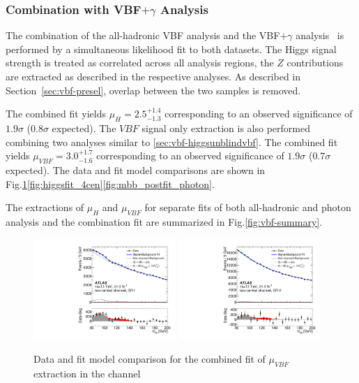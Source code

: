 \subsubsection{Combination with VBF$+\gamma$ Analysis}
\label{sec:vbf-higgscomb}

The combination of the all-hadronic VBF analysis and the
VBF$+\gamma$ analysis~\cite{vbfplusgammaint} is performed
by a simultaneous likelihood fit to both datasets. The Higgs signal strength is
treated as correlated across all analysis regions,
the $Z$ contributions are extracted as described in the respective analyses.
As described in Section~\ref{sec:vbf-presel}, overlap between the two samples is removed.

The combined fit yields $\mu_H = 2.5^{+1.4}_{-1.3}$ corresponding to an observed significance
of $1.9\sigma$ ($0.8\sigma$ expected). The $VBF$ signal only extraction is also performed combining two analyses similar to \ref{sec:vbf-higgsunblindvbf}. The combined fit yields $\mu_{VBF} =3.0^{+1.7}_{-1.6}$ corresponding to an observed significance of $1.9\sigma$ ($0.7\sigma$ expected). The data and fit model comparisons are shown in Fig.\ref{fig:higgsfit_2cen}\ref{fig:higgsfit_4cen}\ref{fig:mbb_postfit_photon}.

The extractions of $\mu_{H}$ and $\mu_{VBF}$ for separate fits of both all-hadronic and photon analysis and the combination fit are summarized in Fig.\ref{fig:vbf-summary}.


\begin{figure}[htbp]
  \centering
 \includegraphics[width=0.48\textwidth]{figures/VBF/comb_vbfonly_testVBF_ICHEP_2cen_SRI_vbfincl.pdf}
 \includegraphics[width=0.48\textwidth]{figures/VBF/comb_vbfonly_testVBF_ICHEP_2cen_SRII_vbfincl.pdf}\\

\caption{Data and fit model comparison for the combined fit of $\mu_{VBF}$ extraction in the \twocentral channel}
  \label{fig:higgsfit_2cen}
\end{figure}

